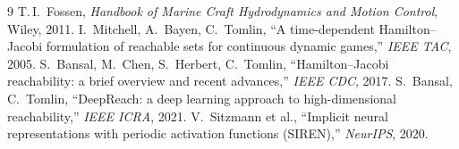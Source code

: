 \documentclass[11pt]{article}
\begin{document}
\begin{thebibliography}{9}
 T.\,I.\ Fossen, \emph{Handbook of Marine Craft Hydrodynamics and
Motion Control}, Wiley, 2011.
 I.\ Mitchell, A.\ Bayen, C.\ Tomlin, ``A time-dependent
Hamilton--Jacobi formulation of reachable sets for continuous dynamic games,''
\emph{IEEE TAC}, 2005.
 S.\ Bansal, M.\ Chen, S.\ Herbert, C.\ Tomlin, ``Hamilton--Jacobi
reachability: a brief overview and recent advances,'' \emph{IEEE CDC}, 2017.
 S.\ Bansal, C.\ Tomlin, ``DeepReach: a deep learning approach
to high-dimensional reachability,'' \emph{IEEE ICRA}, 2021.
 V.\ Sitzmann et al., ``Implicit neural representations with
periodic activation functions (SIREN),'' \emph{NeurIPS}, 2020.
\end{thebibliography}
\end{document}
